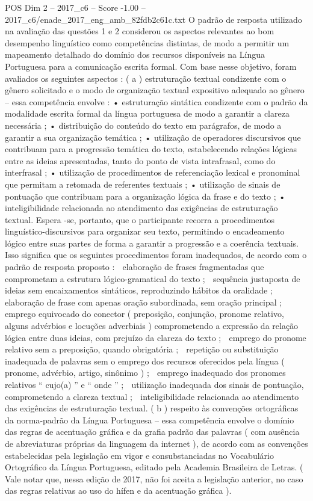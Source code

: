 \begin{textsample}{POS Dim 2 – 2017\_c6 – Score -1.00 – 2017\_c6/enade\_2017\_eng\_amb\_82fdb2c61c.txt}
O padrão de resposta utilizado na avaliação das questões 1 e 2 considerou os aspectos relevantes ao bom desempenho linguístico como competências distintas, de modo a permitir um mapeamento detalhado do domínio dos recursos disponíveis na Língua Portuguesa para a comunicação escrita formal.
Com base nesse objetivo, foram avaliados os seguintes aspectos : ( a ) estruturação textual condizente com o gênero solicitado e o modo de organização textual expositivo adequado ao gênero – essa competência envolve : • estruturação sintática condizente com o padrão da modalidade escrita formal da língua portuguesa de modo a garantir a clareza necessária ; • distribuição do conteúdo do texto em parágrafos, de modo a garantir a sua organização temática ; • utilização de operadores discursivos que contribuam para a progressão temática do texto, estabelecendo relações lógicas entre as ideias apresentadas, tanto do ponto de vista intrafrasal, como do interfrasal ; • utilização de procedimentos de referenciação lexical e pronominal que permitam a retomada de referentes textuais ; • utilização de sinais de pontuação que contribuam para a organização lógica da frase e do texto ; • inteligibilidade relacionada ao atendimento das exigências de estruturação textual.
Espera -se, portanto, que o participante recorra a procedimentos linguístico-discursivos para organizar seu texto, permitindo o encadeamento lógico entre suas partes de forma a garantir a progressão e a coerência textuais.
Isso significa que os seguintes procedimentos foram inadequados, de acordo com o padrão de resposta proposto :  elaboração de frases fragmentadas que comprometam a estrutura lógico-gramatical do texto ;  sequência justaposta de ideias sem encaixamentos sintáticos, reproduzindo hábitos da oralidade ;  elaboração de frase com apenas oração subordinada, sem oração principal ;  emprego equivocado do conector ( preposição, conjunção, pronome relativo, alguns advérbios e locuções adverbiais ) comprometendo a expressão da relação lógica entre duas ideias, com prejuízo da clareza do texto ;  emprego do pronome relativo sem a preposição, quando obrigatória ;  repetição ou substituição inadequada de palavras sem o emprego dos recursos oferecidos pela língua ( pronome, advérbio, artigo, sinônimo ) ;  emprego inadequado dos pronomes relativos “ cujo(a) ” e “ onde ” ;  utilização inadequada dos sinais de pontuação, comprometendo a clareza textual ;  inteligibilidade relacionada ao atendimento das exigências de estruturação textual. ( b ) respeito às convenções ortográficas da norma-padrão da Língua Portuguesa – essa competência envolve o domínio das regras de acentuação gráfica e da grafia padrão das palavras ( com ausência de abreviaturas próprias da linguagem da internet ), de acordo com as convenções estabelecidas pela legislação em vigor e consubstanciadas no Vocabulário Ortográfico da Língua Portuguesa, editado pela Academia Brasileira de Letras. ( Vale notar que, nessa edição de 2017, não foi aceita a legislação anterior, no caso das regras relativas ao uso do hífen e da acentuação gráfica ).

\end{textsample}
